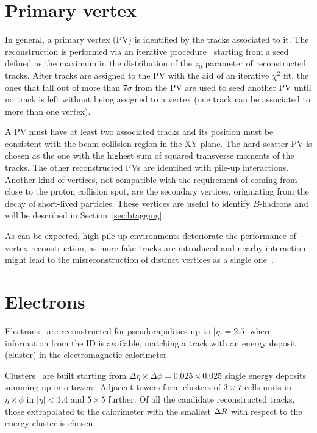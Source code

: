 \section{Primary vertex}\label{sec:primaryvertex}

In general, a primary vertex (PV) is identified by the tracks associated to it.
The reconstruction is performed via an iterative procedure~\cite{ATLAS-CONF-2010-069}
starting from a seed defined as the maximum in the distribution of the $z_0$ parameter
of reconstructed tracks. After tracks are assigned to the PV with the aid of an
iterative $\chi^2$ fit, the ones that fall out of more than 7$\sigma$ from the PV
are used to seed another PV until no track is left without being assigned to a vertex
(one track can be associated to more than one vertex).

A PV must have at least two associated tracks and its position must be consistent with 
the beam collision region in the XY plane. The hard-scatter PV is chosen as the one
with the highest sum of squared transverse moments of the tracks. The other reconstructed PVs 
are identified with pile-up interactions. Another kind of vertices, not
compatible with the requirement of coming from close to the proton collision spot,
are the secondary vertices, originating from the decay of short-lived particles.
These vertices are useful to identify $B$-hadrons and will be described in Section~\ref{sec:btagging}.

As can be expected, high pile-up environments deteriorate the performance of vertex reconstruction,
as more fake tracks are introduced and nearby interaction might lead to the misreconstruction
of distinct vertices as a single one~\cite{ATLAS-CONF-2012-042}.


\section{Electrons}\label{sec:electrons}
Electrons~\cite{eperf} are reconstructed for pseudorapidities up to $|\eta| = 2.5$, where
information from the ID is available, matching a track with an energy deposit
(cluster) in the electromagnetic calorimeter. 

Clusters~\cite{topocluster} are built starting from
$\Delta\eta\times\Delta\phi=0.025\times0.025$ single energy deposits summing
up into towers. Adjacent towers form clusters of $3\times7$ cells units in $\eta\times\phi$
in $|\eta|<1.4$ and $5\times5$ further. Of all the candidate reconstructed tracks,
those extrapolated to the calorimeter with the smallest $\dr$ with respect to the
energy cluster is chosen.

